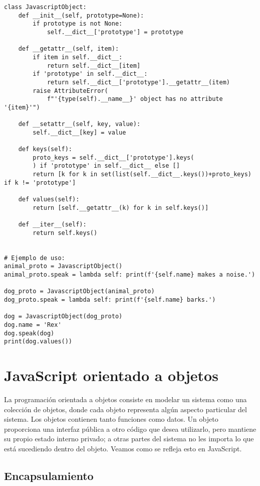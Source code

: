 \documentclass{article}
\begin{document}
\begin{lstlisting}
class JavascriptObject:
    def __init__(self, prototype=None):
        if prototype is not None:
            self.__dict__['prototype'] = prototype

    def __getattr__(self, item):
        if item in self.__dict__:
            return self.__dict__[item]
        if 'prototype' in self.__dict__:
            return self.__dict__['prototype'].__getattr__(item)
        raise AttributeError(
            f"'{type(self).__name__}' object has no attribute '{item}'")

    def __setattr__(self, key, value):
        self.__dict__[key] = value

    def keys(self):
        proto_keys = self.__dict__['prototype'].keys(
        ) if 'prototype' in self.__dict__ else []
        return [k for k in set(list(self.__dict__.keys())+proto_keys) if k != 'prototype']

    def values(self):
        return [self.__getattr__(k) for k in self.keys()]

    def __iter__(self):
        return self.keys()


# Ejemplo de uso:
animal_proto = JavascriptObject()
animal_proto.speak = lambda self: print(f'{self.name} makes a noise.')

dog_proto = JavascriptObject(animal_proto)
dog_proto.speak = lambda self: print(f'{self.name} barks.')

dog = JavascriptObject(dog_proto)
dog.name = 'Rex'
dog.speak(dog)
print(dog.values())
\end{lstlisting}

\section{JavaScript orientado a objetos}

La programación orientada a objetos consiste en modelar un sistema como una 
colección de objetos, donde cada objeto representa algún aspecto particular 
del sistema. Los objetos contienen tanto funciones como datos. 
Un objeto proporciona una interfaz pública a otro código que desea utilizarlo, 
pero mantiene su propio estado interno privado; a otras partes del sistema 
no les importa lo que está sucediendo dentro del objeto. Veamos como se 
refleja esto en JavaScript.

\subsection{Encapsulamiento}
\end{document}
